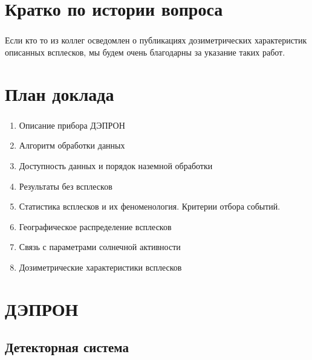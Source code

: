 \documentclass[t, aspectratio=43]{beamer}
\begin{document}
\section{Кратко по истории вопроса}\label{header-n22}

\begin{frame}	
\frametitle{\insertsection} 

Если кто то из коллег осведомлен о публикациях дозиметрических
характеристик описанных всплесков, мы будем очень благодарны за указание
таких работ.

\end{frame}

\section{План доклада}\label{header-n26}
\begin{frame}	
\frametitle{\insertsection} 
\begin{enumerate}
	\def\labelenumi{\arabic{enumi}.}
	\item
	Описание прибора ДЭПРОН
	\item
	Алгоритм обработки данных
	\item
	Доступность данных и порядок наземной обработки
	\item
	Результаты без всплесков
	\item
	Статистика всплесков и их феноменология. Критерии отбора событий.
	\item
	Географическое распределение всплесков
	\item
	Связь с параметрами солнечной активности
	\item
	Дозиметрические характеристики всплесков
\end{enumerate}

\end{frame}



\section{ДЭПРОН}
\subsection{Детекторная система}
\end{document}
